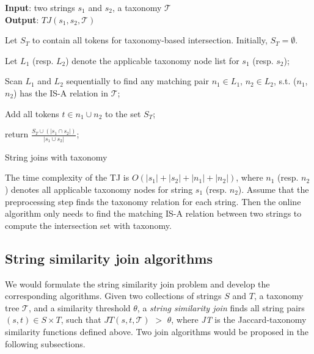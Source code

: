 \begin{algorithm}
{\bf Input}: two strings $s_1$ and $s_2$, a taxonomy $\mathcal{T}$ \\
{\bf Output}: $TJ(s_1,s_2,\mathcal{T})$
\begin{compactenum}[(1)]
\item Let $S_T $ to contain all tokens for taxonomy-based intersection. Initially, $S_T = \emptyset$.
\item Let $L_1$ (resp. $L_2$) denote the applicable taxonomy node list for $s_1$ (resp. $s_2$);
\item Scan $L_1$ and $L_2$ sequentially to find any matching pair $n_1 \in L_1$, $n_2 \in L_2$, s.t. ($n_1$,$n_2$) has the IS-A relation in $\mathcal{T}$;
\item Add all tokens $t \in n_1 \cup n_2$ to the set $S_T$;
\item  return $\frac{S_T \cup (|s_1 \cap s_2|)}{|s_1 \cup s_2|}$;
\end{compactenum}
\caption{String joins with taxonomy}
\label{alg:exactjoin}
\end{algorithm}

The time complexity of the TJ is $O(|s_1|+|s_2|+|n_1|+|n_2|)$, where $n_1$ (resp. $n_2$) denotes all applicable taxonomy nodes for string $s_1$  (resp. $n_2$). Assume that the preprocessing step finds the taxonomy relation for each string. Then the online algorithm only needs to find the matching IS-A relation between two strings to compute the intersection set with taxonomy.

\subsection{String similarity join algorithms}



We would formulate the string similarity join problem and develop the corresponding algorithms. Given two collections of strings $S$ and $T$, a taxonomy tree
$\mathcal{T}$, and a similarity threshold $\theta$, a \textit{string
  similarity join} finds all string pairs $(s, t) \in S \times T$,
such that $JT(s,t,\mathcal{T})$ $>$ $\theta$, where \textit{JT} is
 the Jaccard-taxonomy similarity functions defined above. Two join algorithms would be proposed in the following subsections.



